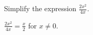 \question Simplify the expression $\frac{2x^2}{4x}$.
\begin{solution}
$\frac{2x^2}{4x} = \frac{x}{2}$ for $x \neq 0$.
\end{solution}
